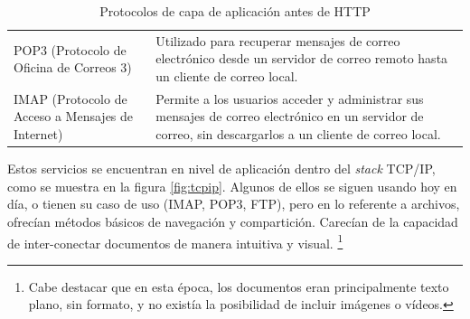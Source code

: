 \begin{table}[h]
\begin{tabular}{>{\raggedright}m{3cm}m{10cm}}
            \addlinespace
            POP3 (Protocolo de Oficina de Correos 3)             & Utilizado para recuperar mensajes de correo electrónico desde un servidor de correo remoto hasta un cliente de correo local.                                        \\
            \addlinespace
            IMAP (Protocolo de Acceso a Mensajes de Internet)    & Permite a los usuarios acceder y administrar sus mensajes de correo electrónico en un servidor de correo, sin descargarlos a un cliente de correo local.            \\
            \bottomrule
      \end{tabular}
      \caption{Protocolos de capa de aplicación antes de HTTP}
      \label{fig:evolucion-protocolos}
\end{table}

Estos servicios se encuentran en nivel de aplicación dentro del \textit{stack} TCP/IP, como se muestra en la figura \ref{fig:tcpip}.
Algunos de ellos se siguen usando hoy en día, o tienen su caso de uso (IMAP, POP3, FTP), pero en lo referente a archivos,
ofrecían métodos básicos de navegación y compartición. Carecían de la capacidad de inter-conectar documentos de manera intuitiva y visual.
\footnote{Cabe destacar que en esta época, los documentos eran principalmente texto plano, sin formato, y no existía la posibilidad de incluir imágenes o vídeos.}

